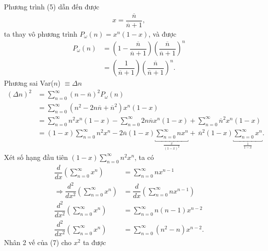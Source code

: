 \documentclass{report}
\newcommand{\f}[2]{\dfrac{#1}{#2}}
\begin{document}
Phương trình (5) dẫn đến được
\begin{align*}
	x = \f{\overline{n}}{\overline{n} + 1},
\end{align*}
ta thay vô phương trình $P_{\omega}(n) = x^{n} (1-x)$, và được
\begin{align*}
	P_{\omega}(n)
	& = \left(1 - \f{\overline{n}}{\overline{n} + 1}\right) \left(\f{\overline{n}}{\overline{n} + 1}\right)^{n} \\
	& = \left(\f{1}{\overline{n} + 1}\right)\left(\f{\overline{n}}{\overline{n} + 1}\right)^{n} .
\end{align*}
Phương sai Var($n$) $\equiv \Delta n$
\begin{align*}
	(\Delta n)^2
	& = \sum_{n = 0}^{\infty}(n - \overline{n})^2 P_{\omega}(n)                                                                                                                                                                  \\
	& = \sum_{n = 0}^{\infty}(n^2 - 2n\overline{n} + \overline{n}^2) x^{n} (1-x)                                                                                                                                                 \\
	& = \sum_{n = 0}^{\infty}n^2 x^{n} (1-x) - \sum_{n = 0}^{\infty}2n\overline{n} x^{n} (1-x) + \sum_{n = 0}^{\infty}\overline{n}^2 x^{n} (1-x)                                                                                 \\
	& = (1-x)\sum_{n = 0}^{\infty}n^2 x^{n} - 2\overline{n}(1-x)\underbracket{\sum_{n = 0}^{\infty}n x^{n}}_{\frac{x}{(1 - x)^2}}  +\, \overline{n}^2(1-x) \underbracket{\sum_{n = 0}^{\infty} x^{n}}_{\frac{1}{1 - x}}. \tag{6}
\end{align*}
Xét số hạng đầu tiên $(1-x)\sum_{n = 0}^{\infty}n^2 x^{n}$, ta có
\begin{align*}
	\f{d}{dx} \left( \sum_{n = 0}^{\infty} x^{n} \right)
	& = \sum_{n = 0}^{\infty} n x^{n-1}                          \\
	\Rightarrow \f{d^2}{dx^2} \left( \sum_{n = 0}^{\infty} x^{n} \right)
	& = \f{d}{dx} \left( \sum_{n = 0}^{\infty} n x^{n-1} \right) \\
	\f{d^2}{dx^2} \left( \sum_{n = 0}^{\infty} x^{n} \right) & = \sum_{n = 0}^{\infty} n(n-1) x^{n-2}                     \\
	\f{d^2}{dx^2} \left( \sum_{n = 0}^{\infty} x^{n} \right) & = \sum_{n = 0}^{\infty} (n^2-n) x^{n-2}. \tag{7}
\end{align*}
Nhân 2 vế của (7) cho $x^2$ ta được
\end{document}
